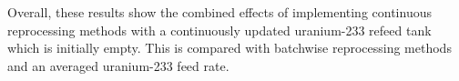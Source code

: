 Overall, these results show the combined effects of implementing continuous reprocessing methods with a continuously updated uranium-233 refeed tank which is initially empty. This is compared with batchwise reprocessing methods and an averaged uranium-233 feed rate.








